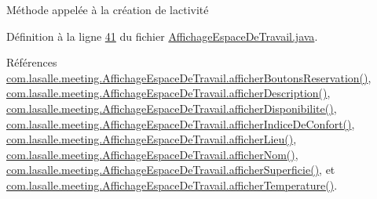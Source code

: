 Méthode appelée à la création de l\textquotesingle{}activité 



Définition à la ligne \hyperlink{_affichage_espace_de_travail_8java_source_l00041}{41} du fichier \hyperlink{_affichage_espace_de_travail_8java_source}{Affichage\+Espace\+De\+Travail.\+java}.



Références \hyperlink{_affichage_espace_de_travail_8java_source_l00150}{com.\+lasalle.\+meeting.\+Affichage\+Espace\+De\+Travail.\+afficher\+Boutons\+Reservation()}, \hyperlink{_affichage_espace_de_travail_8java_source_l00083}{com.\+lasalle.\+meeting.\+Affichage\+Espace\+De\+Travail.\+afficher\+Description()}, \hyperlink{_affichage_espace_de_travail_8java_source_l00127}{com.\+lasalle.\+meeting.\+Affichage\+Espace\+De\+Travail.\+afficher\+Disponibilite()}, \hyperlink{_affichage_espace_de_travail_8java_source_l00116}{com.\+lasalle.\+meeting.\+Affichage\+Espace\+De\+Travail.\+afficher\+Indice\+De\+Confort()}, \hyperlink{_affichage_espace_de_travail_8java_source_l00072}{com.\+lasalle.\+meeting.\+Affichage\+Espace\+De\+Travail.\+afficher\+Lieu()}, \hyperlink{_affichage_espace_de_travail_8java_source_l00061}{com.\+lasalle.\+meeting.\+Affichage\+Espace\+De\+Travail.\+afficher\+Nom()}, \hyperlink{_affichage_espace_de_travail_8java_source_l00094}{com.\+lasalle.\+meeting.\+Affichage\+Espace\+De\+Travail.\+afficher\+Superficie()}, et \hyperlink{_affichage_espace_de_travail_8java_source_l00105}{com.\+lasalle.\+meeting.\+Affichage\+Espace\+De\+Travail.\+afficher\+Temperature()}.


